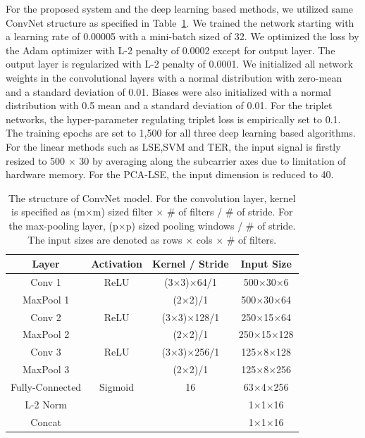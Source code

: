 \documentclass[runningheads]{llncs}
\begin{document}
For the proposed system and the deep learning based methods, we utilized same ConvNet structure as specified in Table~\ref{tab1}. We trained the network starting with a learning rate of 0.00005 with a mini-batch sized of 32. We optimized the loss by the Adam optimizer with L-2 penalty of 0.0002 except for output layer. The output layer is regularized with L-2 penalty of 0.0001. We initialized all network weights in the convolutional layers with a normal distribution with zero-mean and a standard deviation of 0.01. Biases were also initialized with a normal distribution with 0.5 mean and a standard deviation of 0.01. For the triplet networks, the hyper-parameter regulating triplet loss is empirically set to 0.1. The training epochs are set to 1,500 for all three deep learning based algorithms. For the linear methods such as LSE,SVM and TER, the input signal is firstly resized to 500 $\times$ 30 by averaging along the subcarrier axes due to limitation of hardware memory. For the PCA-LSE, the input dimension is reduced to 40.
 
 \begin{table}[]
    \caption{
        The structure of ConvNet model. For the convolution layer, kernel is specified as (m$\times$m) sized filter $\times$ \# of filters / \# of stride. For the max-pooling layer, (p$\times$p) sized pooling windows / \# of stride. The input sizes are denoted as rows $\times$ cols $\times$ \# of filters. 
    }\label{tab1}
    \centering
    \begin{tabular}{|c|c|c|c|}
    \hline
    Layer     & Activation & Kernel / Stride & Input Size \\ \hline
    Conv 1    & ReLU       & (3$\times$3)$\times$64/1      & 500$\times$30$\times$6   \\
    MaxPool 1 &            & (2$\times$2)/1         & 500$\times$30$\times$64  \\
    Conv 2    & ReLU       & (3$\times$3)$\times$128/1     & 250$\times$15$\times$64 \\
    MaxPool 2 &            & (2$\times$2)/1         & 250$\times$15$\times$128 \\
    Conv 3    & ReLU       & (3$\times$3)$\times$256/1     & 125$\times$8$\times$128  \\
    MaxPool 3 &            & (2$\times$2)/1         & 125$\times$8$\times$256  \\
    Fully-Connected     & Sigmoid    & 16             & 63$\times$4$\times$256   \\
    L-2 Norm  &            &                 & 1$\times$1$\times$16    \\
    Concat    &            &                 & 1$\times$1$\times$16    \\ \hline
    \end{tabular}
\end{table}
\end{document}

